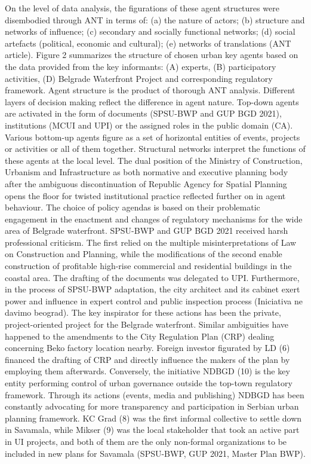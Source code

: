 \documentclass[11pt]{report}
\begin{document}
On the level of data analysis, the figurations of these agent structures were disembodied through ANT in terms of: (a) the nature of actors; (b) structure and networks of influence; (c) secondary and socially functional networks; (d) social artefacts (political, economic and cultural); (e) networks of translations (ANT article). Figure 2 summarizes the structure of chosen urban key agents based on the data provided from the key informants: (A) experts, (B) participatory activities, (D) Belgrade Waterfront Project and corresponding regulatory framework. Agent structure is the product of thorough ANT analysis. Different layers of decision making reflect the difference in agent nature. Top-down agents are activated in the form of documents (SPSU-BWP and GUP BGD 2021), institutions (MCUI and UPI) or the assigned roles in the public domain (CA). Various bottom-up agents figure as a set of horizontal entities of events, projects or activities or all of them together. Structural networks interpret the functions of these agents at the local level. The dual position of the Ministry of Construction, Urbanism and Infrastructure as both normative and executive planning body after the ambiguous discontinuation of Republic Agency for Spatial Planning opens the floor for twisted institutional practice reflected further on in agent behaviour. The choice of policy agendas is based on their problematic engagement in the enactment and changes of regulatory mechanisms for the wide area of Belgrade waterfront. SPSU-BWP and GUP BGD 2021 received harsh professional criticism. The first relied on the multiple misinterpretations of Law on Construction and Planning, while the modifications of the second enable construction of profitable high-rise commercial and residential buildings in the coastal area. The drafting of the documents was delegated to UPI. Furthermore, in the process of SPSU-BWP adaptation, the city architect and its cabinet  exert power and influence in expert control and public inspection process (Iniciativa ne davimo beograd). The key inspirator for these actions has been the private, project-oriented project for the Belgrade waterfront. Similar ambiguities have happened to the amendments to the City Regulation Plan (CRP) dealing concerning Beko factory location nearby. Foreign investor figurated by LD (6) financed the drafting of CRP and directly influence the makers of the plan by employing them afterwards. Conversely, the initiative NDBGD (10) is the key entity performing control of urban governance outside the top-town regulatory framework. Through its actions (events, media and publishing) NDBGD has been constantly advocating for more transparency and participation in Serbian urban planning framework. KC Grad (8) was the first informal collective to settle down in Savamala, while Mikser (9) was the local stakeholder that took an active part in UI projects, and both of them are the only non-formal organizations to be included in new plans for Savamala (SPSU-BWP, GUP 2021, Master Plan BWP).
\end{document}
